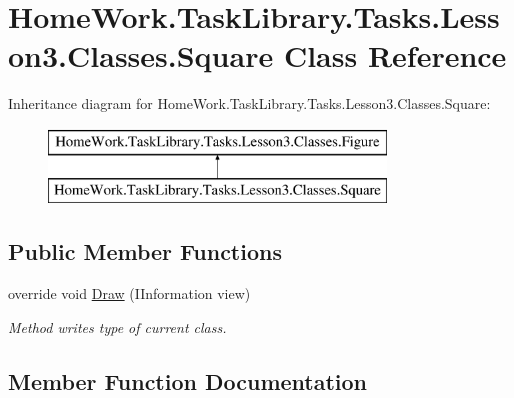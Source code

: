 \hypertarget{class_home_work_1_1_task_library_1_1_tasks_1_1_lesson3_1_1_classes_1_1_square}{}\section{Home\+Work.\+Task\+Library.\+Tasks.\+Lesson3.\+Classes.\+Square Class Reference}
\label{class_home_work_1_1_task_library_1_1_tasks_1_1_lesson3_1_1_classes_1_1_square}
Inheritance diagram for Home\+Work.\+Task\+Library.\+Tasks.\+Lesson3.\+Classes.\+Square\+:\begin{figure}[H]
\begin{center}
\leavevmode
\includegraphics[height=2.000000cm]{class_home_work_1_1_task_library_1_1_tasks_1_1_lesson3_1_1_classes_1_1_square}
\end{center}
\end{figure}
\subsection*{Public Member Functions}
\begin{DoxyCompactItemize}
\item 
override void \mbox{\hyperlink{class_home_work_1_1_task_library_1_1_tasks_1_1_lesson3_1_1_classes_1_1_square_adeccae1e360884d3ab80165ee3a47d7a}{Draw}} (I\+Information view)
\begin{DoxyCompactList}\small\item\em Method writes type of current class. \end{DoxyCompactList}\end{DoxyCompactItemize}


\subsection{Member Function Documentation}
\mbox{\label{class_home_work_1_1_task_library_1_1_tasks_1_1_lesson3_1_1_classes_1_1_square_adeccae1e360884d3ab80165ee3a47d7a}} 
